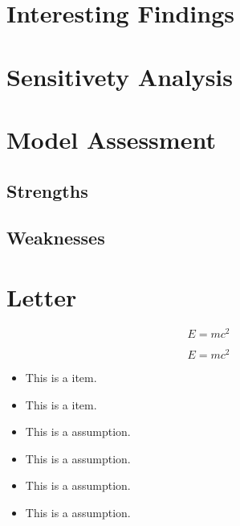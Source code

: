 \documentclass{mcmthesis}  %
\begin{document}
\section{Interesting Findings}  %

\section{Sensitivety Analysis}  %

\section{Model Assessment}

\subsection{Strengths}
\subsection{Weaknesses}

\section{Letter}



\begin{equation}  %
E = mc^2 \label{aa}  %
\end{equation}  %

\begin{equation}  %
\nonumber %
E = mc^2
\end{equation}  %


\begin{itemize}  %
        \item This is a item.
        \item This is a item.
\end{itemize}  %


\begin{itemize}  %
                \item This is a assumption.
                \item This is a assumption.
                \item This is a assumption.
                \item This is a assumption.
 \end{itemize}  %
\end{document}
